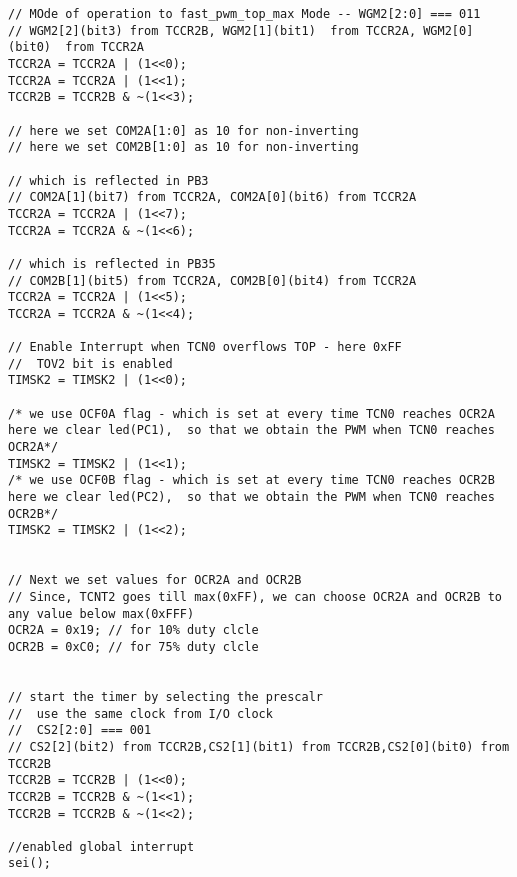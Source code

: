 \begin{verbatim}
// MOde of operation to fast_pwm_top_max Mode -- WGM2[2:0] === 011
// WGM2[2](bit3) from TCCR2B, WGM2[1](bit1)  from TCCR2A, WGM2[0](bit0)  from TCCR2A
TCCR2A = TCCR2A | (1<<0);
TCCR2A = TCCR2A | (1<<1);
TCCR2B = TCCR2B & ~(1<<3);	

// here we set COM2A[1:0] as 10 for non-inverting
// here we set COM2B[1:0] as 10 for non-inverting

// which is reflected in PB3
// COM2A[1](bit7) from TCCR2A, COM2A[0](bit6) from TCCR2A
TCCR2A = TCCR2A | (1<<7);
TCCR2A = TCCR2A & ~(1<<6);

// which is reflected in PB35
// COM2B[1](bit5) from TCCR2A, COM2B[0](bit4) from TCCR2A
TCCR2A = TCCR2A | (1<<5);
TCCR2A = TCCR2A & ~(1<<4);

// Enable Interrupt when TCN0 overflows TOP - here 0xFF
//  TOV2 bit is enabled
TIMSK2 = TIMSK2 | (1<<0);

/* we use OCF0A flag - which is set at every time TCN0 reaches OCR2A 
here we clear led(PC1),  so that we obtain the PWM when TCN0 reaches OCR2A*/
TIMSK2 = TIMSK2 | (1<<1);
/* we use OCF0B flag - which is set at every time TCN0 reaches OCR2B 
here we clear led(PC2),  so that we obtain the PWM when TCN0 reaches OCR2B*/
TIMSK2 = TIMSK2 | (1<<2);


// Next we set values for OCR2A and OCR2B
// Since, TCNT2 goes till max(0xFF), we can choose OCR2A and OCR2B to any value below max(0xFFF)
OCR2A = 0x19; // for 10% duty clcle
OCR2B = 0xC0; // for 75% duty clcle


// start the timer by selecting the prescalr
//  use the same clock from I/O clock
//  CS2[2:0] === 001
// CS2[2](bit2) from TCCR2B,CS2[1](bit1) from TCCR2B,CS2[0](bit0) from TCCR2B
TCCR2B = TCCR2B | (1<<0);
TCCR2B = TCCR2B & ~(1<<1);
TCCR2B = TCCR2B & ~(1<<2);

//enabled global interrupt
sei();
\end{verbatim}

